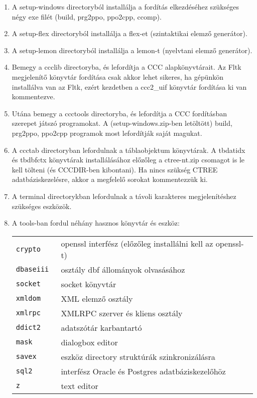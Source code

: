 \begin{enumerate}
\item
A setup-windows directoryból installálja a  fordítás
elkezdéséhez szükséges négy exe filét (build, prg2ppo, ppo2cpp, ccomp).

\item
A setup-flex directoryból installálja a flex-et (szintaktikai elemző
generátor).

\item
A setup-lemon directoryból installálja a lemon-t (nyelvtani
elemző generátor).

\item
Bemegy a ccclib directoryba, és lefordítja a CCC alapkönyvtárait.
Az Fltk megjelenítő könyvtár fordítása csak akkor lehet sikeres,
ha  gépünkön installálva van az Fltk, ezért
kezdetben a ccc2\_uif könyvtár fordítása ki van kommentezve.

\item
Utána bemegy a ccctools directoryba, és lefordítja a CCC fordításban
szerepet játszó programokat.  A (setup-windows.zip-ben letöltött)
build, prg2ppo, ppo2cpp programok most lefordítják saját magukat.

\item
A ccctab directoryban lefordulnak a táblaobjektum könyvtárak.
A tbdatidx és tbdbfctx könyvtárak installálásához előzőleg a ctree-nt.zip
csomagot is le kell tölteni (és CCCDIR-ben kibontani). Ha nincs
szükség CTREE adatbáziskezelésre, akkor a megfelelő sorokat 
kommentezzük ki.

\item
A terminal directorykban lefordulnak a távoli karakteres megjelenítéshez
szükséges eszközök.

\item
A tools-ban fordul néhány hasznos könyvtár és eszköz:
\begin{tabular}{ll}
\tt  crypto   & openssl interfész (előzőleg installálni kell az openssl-t) \\
\tt  dbaseiii & osztály dbf állományok olvasásához \\ 
\tt  socket   & socket könyvtár \\ 
\tt  xmldom   & XML elemző osztály \\ 
\tt  xmlrpc   & XMLRPC szerver és kliens osztály \\ 
\tt  ddict2   & adatszótár karbantartó \\ 
\tt  mask     & dialogbox editor \\ 
\tt  savex    & eszköz directory struktúrák szinkronizálásra \\ 
\tt  sql2     & interfész Oracle és Postgres adatbáziskezelőhöz \\ 
\tt  z        & text editor \\ 
\end{tabular}
\end{enumerate}


